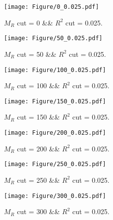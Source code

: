  
\begin{figure}[H] 
\begin{center} 
\texttt{[image: Figure/0\_0.025.pdf]} 
\caption{$M_R$ cut = 0 \&\& $R^2$ cut = 0.025.} 
\label{Fig:0_0.025} 
\end{center} 
\end{figure} 
 
 
\begin{figure}[H] 
\begin{center} 
\texttt{[image: Figure/50\_0.025.pdf]} 
\caption{$M_R$ cut = 50 \&\& $R^2$ cut = 0.025.} 
\label{Fig:50_0.025} 
\end{center} 
\end{figure} 
 
 
\begin{figure}[H] 
\begin{center} 
\texttt{[image: Figure/100\_0.025.pdf]} 
\caption{$M_R$ cut = 100 \&\& $R^2$ cut = 0.025.} 
\label{Fig:100_0.025} 
\end{center} 
\end{figure} 
 
 
\begin{figure}[H] 
\begin{center} 
\texttt{[image: Figure/150\_0.025.pdf]} 
\caption{$M_R$ cut = 150 \&\& $R^2$ cut = 0.025.} 
\label{Fig:150_0.025} 
\end{center} 
\end{figure} 
 
 
\begin{figure}[H] 
\begin{center} 
\texttt{[image: Figure/200\_0.025.pdf]} 
\caption{$M_R$ cut = 200 \&\& $R^2$ cut = 0.025.} 
\label{Fig:200_0.025} 
\end{center} 
\end{figure} 
 
 
\begin{figure}[H] 
\begin{center} 
\texttt{[image: Figure/250\_0.025.pdf]} 
\caption{$M_R$ cut = 250 \&\& $R^2$ cut = 0.025.} 
\label{Fig:250_0.025} 
\end{center} 
\end{figure} 
 
 
\begin{figure}[H] 
\begin{center} 
\texttt{[image: Figure/300\_0.025.pdf]} 
\caption{$M_R$ cut = 300 \&\& $R^2$ cut = 0.025.} 
\label{Fig:300_0.025} 
\end{center} 
\end{figure} 
 
